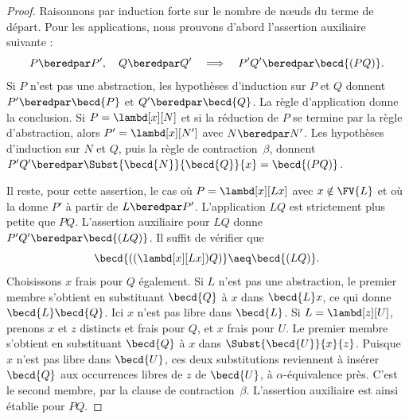 \documentclass[../../../include/open-logic-section]{subfiles}
\begin{document}
\begin{proof}
Raisonnons par induction forte sur le nombre de nœuds du
terme de départ. Pour les applications, nous prouvons
d'abord l'assertion auxiliaire suivante :
\[
  P\beredpar P',\quad Q\beredpar Q'
  \quad\Longrightarrow\quad P'Q'\beredpar\becd{(PQ)}.
\]
Si $P$ n'est pas une abstraction, les hypothèses d'induction
sur $P$ et $Q$ donnent $P'\beredpar\becd{P}$ et
$Q'\beredpar\becd{Q}$. La règle d'application donne la
conclusion. Si $P=\lambd[x][N]$ et si la réduction de $P$
se termine par la règle d'abstraction, alors
$P'=\lambd[x][N']$ avec $N\beredpar N'$. Les hypothèses
d'induction sur $N$ et $Q$, puis la règle de
contraction~$\beta$, donnent
$P'Q'\beredpar\Subst{\becd{N}}{\becd{Q}}{x}=\becd{(PQ)}$.

Il reste, pour cette assertion, le cas où
$P=\lambd[x][Lx]$ avec $x\notin\FV{L}$ et où la
 donne $P'$ à partir de
$L\beredpar P'$. L'application $LQ$ est strictement
plus petite que $PQ$. L'assertion auxiliaire pour $LQ$
donne $P'Q'\beredpar\becd{(LQ)}$.
Il suffit de vérifier que
\[
  \becd{((\lambd[x][Lx])Q)}\aeq\becd{(LQ)}.
\]
Choisissons $x$ frais pour $Q$ également. Si $L$
n'est pas une abstraction, le premier membre s'obtient
en substituant $\becd{Q}$ à $x$ dans $\becd{L}x$,
ce qui donne $\becd{L}\becd{Q}$. Ici $x$ n'est pas
libre dans $\becd{L}$. Si $L=\lambd[z][U]$, prenons
$x$ et $z$ distincts et frais pour $Q$, et $x$ frais
pour $U$. Le premier membre s'obtient en substituant
$\becd{Q}$ à $x$ dans $\Subst{\becd{U}}{x}{z}$.
Puisque $x$ n'est pas libre dans $\becd{U}$, ces deux
substitutions reviennent à insérer $\becd{Q}$ aux
occurrences libres de $z$ de $\becd{U}$, à
$\alpha$-équivalence près. C'est le second membre,
par la clause de contraction~$\beta$.
L'assertion auxiliaire est ainsi établie pour $PQ$.


\end{proof}
\end{document}
